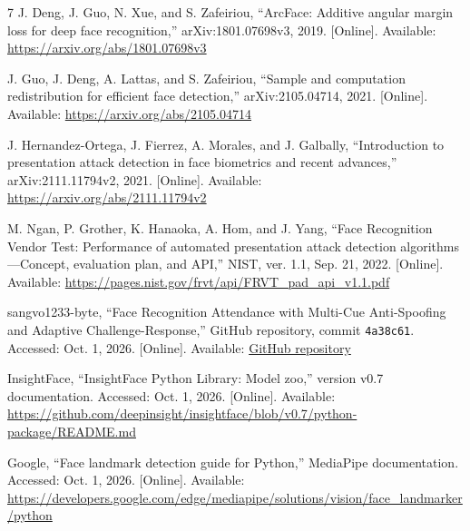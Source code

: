 \documentclass[conference,a4paper]{IEEEtran}
\begin{document}
\begin{thebibliography}{7}
J. Deng, J. Guo, N. Xue, and S. Zafeiriou, ``ArcFace: Additive angular margin loss for deep face recognition,'' arXiv:1801.07698v3, 2019. [Online]. Available: \url{https://arxiv.org/abs/1801.07698v3}

J. Guo, J. Deng, A. Lattas, and S. Zafeiriou, ``Sample and computation redistribution for efficient face detection,'' arXiv:2105.04714, 2021. [Online]. Available: \url{https://arxiv.org/abs/2105.04714}

J. Hernandez-Ortega, J. Fierrez, A. Morales, and J. Galbally, ``Introduction to presentation attack detection in face biometrics and recent advances,'' arXiv:2111.11794v2, 2021. [Online]. Available: \url{https://arxiv.org/abs/2111.11794v2}

M. Ngan, P. Grother, K. Hanaoka, A. Hom, and J. Yang, ``Face Recognition Vendor Test: Performance of automated presentation attack detection algorithms---Concept, evaluation plan, and API,'' NIST, ver. 1.1, Sep. 21, 2022. [Online]. Available: \url{https://pages.nist.gov/frvt/api/FRVT_pad_api_v1.1.pdf}

sangvo1233-byte, ``Face Recognition Attendance with Multi-Cue Anti-Spoofing and Adaptive Challenge-Response,'' GitHub repository, commit \texttt{4a38c61}. Accessed: Oct. 1, 2026. [Online]. Available: \href{https://github.com/sangvo1233-byte/Face-Recognition-Attendance-with-Multi-Cue-Anti-Spoofing-and-Adaptive-Challenge-Response}{GitHub repository}

InsightFace, ``InsightFace Python Library: Model zoo,'' version v0.7 documentation. Accessed: Oct. 1, 2026. [Online]. Available: \url{https://github.com/deepinsight/insightface/blob/v0.7/python-package/README.md}

Google, ``Face landmark detection guide for Python,'' MediaPipe documentation. Accessed: Oct. 1, 2026. [Online]. Available: \url{https://developers.google.com/edge/mediapipe/solutions/vision/face_landmarker/python}
\end{thebibliography}
\end{document}
